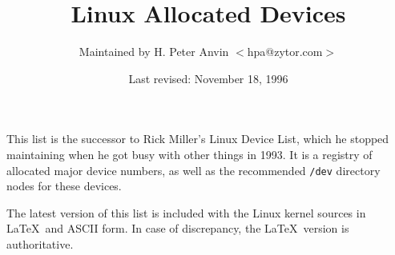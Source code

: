 %
%
\oddsidemargin=0in
\textwidth=6.5in
\topmargin=0in
\headheight=0.5in
\headsep=0.25in
\textheight=7.5in
\footskip=0.75in
\footheight=0.5in
%

\newcommand{\file}{\tt}			%
\newcommand{\hex}{\tt}			%
\newcommand{\ud}{(Under development)}	%
\newcommand{\1}{\({}^1\)}
\newcommand{\2}{\({}^2\)}
\newcommand{\3}{\({}^3\)}
\newcommand{\4}{\({}^4\)}
\newlength{\dig}
\settowidth{\dig}{0}			%
\newcommand{\num}[2]{\makebox[#1\dig][r]{#2}}
\newcommand{\major}[4]{\num{3}{#1}#2 \> #3 \> #4 \\}
\newcommand{\minor}[3]{\> \> \num{3}{#1} \> {\file #2} \> #3 \\}
\newcommand{\minordots}{\> \> \> \dots \\}
\newenvironment{devicelist}%
 {\begin{tabbing}%
000--000 \= blockxxx \= 000 \= {\file /dev/crambamboli} \= foo \kill}%
 {\end{tabbing}}
\newcommand{\link}[4]{{\file #1} \> {\file #2} \> #3 \> #4 \\}
\newcommand{\vlink}[4]{{\file #1} \> {\em #2 \/} \> #3 \> #4 \\}
\newcommand{\node}[3]{{\file #1} \> #2 \> #3 \\}
\newenvironment{nodelist}%
 {\begin{tabbing}%
{\file /dev/crambamboli} \= {\file /proc/self/fd/99} \= symbolicxxx \=
foo \kill}%
 {\end{tabbing}}
%
\title{{\bf Linux Allocated Devices}}
\author{Maintained by H. Peter Anvin $<$hpa@zytor.com$>$}
\date{Last revised: November 18, 1996}
\maketitle
%
\noindent
This list is the successor to Rick Miller's Linux Device List, which
he stopped maintaining when he got busy with other things in 1993.  It
is a registry of allocated major device numbers, as well as the
recommended {\file /dev} directory nodes for these devices.

The latest version of this list is included with the Linux kernel
sources in \LaTeX\ and ASCII form.  In case of discrepancy, the
\LaTeX\ version is authoritative.

